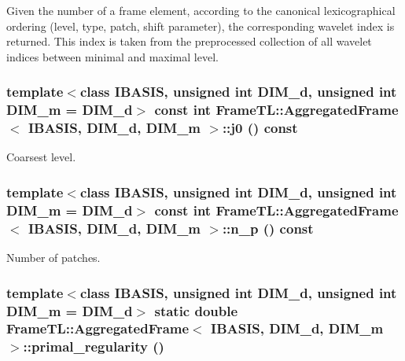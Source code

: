 Given the number of a frame element, according to the canonical lexicographical ordering (level, type, patch, shift parameter), the corresponding wavelet index is returned. This index is taken from the preprocessed collection of all wavelet indices between minimal and maximal level. \hypertarget{classFrameTL_1_1AggregatedFrame_546c96ce6177bacf02fb7bb9b2233d61}{
\subsubsection[{j0}]{\setlength{\rightskip}{0pt plus 5cm}template$<$class IBASIS, unsigned int DIM\_\-d, unsigned int DIM\_\-m = DIM\_\-d$>$ const int {\bf FrameTL::AggregatedFrame}$<$ IBASIS, DIM\_\-d, DIM\_\-m $>$::j0 () const}}
\label{classFrameTL_1_1AggregatedFrame_546c96ce6177bacf02fb7bb9b2233d61}


Coarsest level. \hypertarget{classFrameTL_1_1AggregatedFrame_ca10ffd2b65d7e93c73f8acf4e158a64}{
\subsubsection[{n\_\-p}]{\setlength{\rightskip}{0pt plus 5cm}template$<$class IBASIS, unsigned int DIM\_\-d, unsigned int DIM\_\-m = DIM\_\-d$>$ const int {\bf FrameTL::AggregatedFrame}$<$ IBASIS, DIM\_\-d, DIM\_\-m $>$::n\_\-p () const}}
\label{classFrameTL_1_1AggregatedFrame_ca10ffd2b65d7e93c73f8acf4e158a64}


Number of patches. \hypertarget{classFrameTL_1_1AggregatedFrame_eed976f2ee6c11cfae388c80fffa5fce}{
\subsubsection[{primal\_\-regularity}]{\setlength{\rightskip}{0pt plus 5cm}template$<$class IBASIS, unsigned int DIM\_\-d, unsigned int DIM\_\-m = DIM\_\-d$>$ static double {\bf FrameTL::AggregatedFrame}$<$ IBASIS, DIM\_\-d, DIM\_\-m $>$::primal\_\-regularity ()}}
\label{classFrameTL_1_1AggregatedFrame_eed976f2ee6c11cfae388c80fffa5fce}


